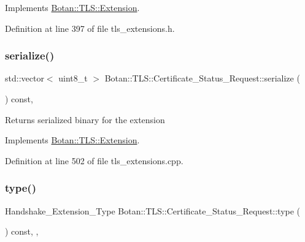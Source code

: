 Implements \mbox{\hyperlink{class_botan_1_1_t_l_s_1_1_extension_aa850b9be2322f94e7c65e583cd51acc5}{Botan\+::\+T\+L\+S\+::\+Extension}}.



Definition at line 397 of file tls\+\_\+extensions.\+h.

\mbox{\label{class_botan_1_1_t_l_s_1_1_certificate___status___request_a9f468e7f03c565cd88f327924fa9ef7c}} 
\subsubsection{\texorpdfstring{serialize()}{serialize()}}
{\footnotesize\ttfamily std\+::vector$<$ uint8\+\_\+t $>$ Botan\+::\+T\+L\+S\+::\+Certificate\+\_\+\+Status\+\_\+\+Request\+::serialize (\begin{DoxyParamCaption}{ }\end{DoxyParamCaption}) const\hspace{0.3cm}{\ttfamily [override]}, {\ttfamily [virtual]}}

\begin{DoxyReturn}{Returns}
serialized binary for the extension 
\end{DoxyReturn}


Implements \mbox{\hyperlink{class_botan_1_1_t_l_s_1_1_extension_a56788726ad2526db54e5a26039cb69db}{Botan\+::\+T\+L\+S\+::\+Extension}}.



Definition at line 502 of file tls\+\_\+extensions.\+cpp.

\mbox{\label{class_botan_1_1_t_l_s_1_1_certificate___status___request_a30a98ada0f7b8cfaec9514794a22f54f}} 
\subsubsection{\texorpdfstring{type()}{type()}}
{\footnotesize\ttfamily Handshake\+\_\+\+Extension\+\_\+\+Type Botan\+::\+T\+L\+S\+::\+Certificate\+\_\+\+Status\+\_\+\+Request\+::type (\begin{DoxyParamCaption}{ }\end{DoxyParamCaption}) const\hspace{0.3cm}{\ttfamily [inline]}, {\ttfamily [override]}, {\ttfamily [virtual]}}

